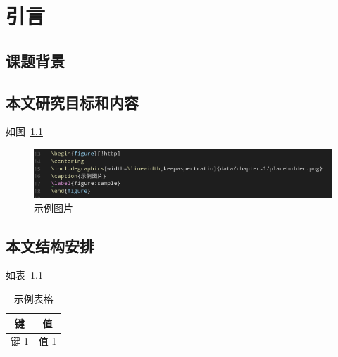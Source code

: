 
\chapter{引言}

\section{课题背景}

\cite{article1}

\section{本文研究目标和内容}

如图~\ref{figure:sample}

\begin{figure}[!htbp]
\centering
\includegraphics[width=\linewidth,keepaspectratio]{fig/2018-03-29-21-41-37.png}
\caption{示例图片}
\label{figure:sample}
\end{figure}

\section{本文结构安排}

如表~\ref{table:sample}

\begin{table}[!htbp]
\caption{示例表格}
\label{table:sample}
\centering
\begin{tabular}{|c|c|}
\hline
键 & 值 \\
\hline
键 1 & 值 1 \\
\hline
\end{tabular}
\end{table}
